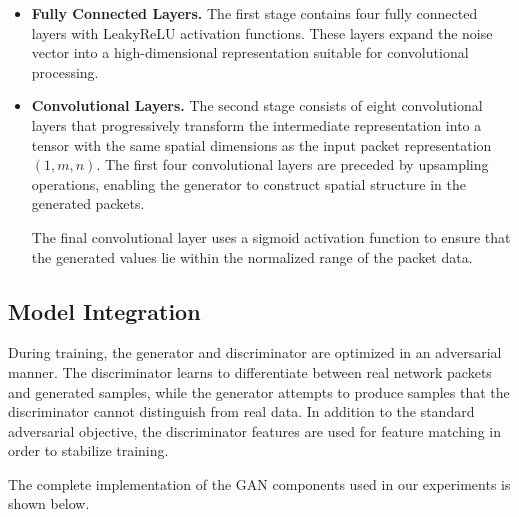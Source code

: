 \begin{itemize}

\item \textbf{Fully Connected Layers.}  
The first stage contains four fully connected layers with LeakyReLU activation functions. These layers expand the noise vector into a high-dimensional representation suitable for convolutional processing.

\item \textbf{Convolutional Layers.}  
The second stage consists of eight convolutional layers that progressively transform the intermediate representation into a tensor with the same spatial dimensions as the input packet representation $(1, m, n)$. The first four convolutional layers are preceded by upsampling operations, enabling the generator to construct spatial structure in the generated packets.

The final convolutional layer uses a sigmoid activation function to ensure that the generated values lie within the normalized range of the packet data.

\end{itemize}

\subsection{Model Integration}

During training, the generator and discriminator are optimized in an adversarial manner. The discriminator learns to differentiate between real network packets and generated samples, while the generator attempts to produce samples that the discriminator cannot distinguish from real data. In addition to the standard adversarial objective, the discriminator features are used for feature matching in order to stabilize training.

The complete implementation of the GAN components used in our experiments is shown below.

